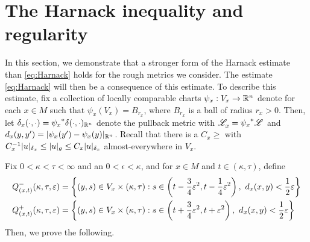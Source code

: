 \documentclass[a4paper, 12pt]{amsart}
\begin{document}
%

\section{The Harnack inequality and regularity}
\label{sec:harnack}


In this section, we demonstrate that a
 stronger form of the  Harnack 
estimate than \eqref{eq:Harnack} holds for the rough 
metrics we consider. The estimate \eqref{eq:Harnack} 
will then be a consequence of this estimate.
To describe this estimate, fix a collection of 
locally comparable charts $\psi_x:V_x \to \mathbb{R}^n$ denote
for each $x \in M$ such that $\psi_x(V_x) = B_{r_x}$,
where $B_{r_x}$ is a ball of radius $r_x > 0$. 
Then, let
$\delta_x(\cdot, \cdot) = {\psi_x}^\ast\delta(\cdot, \cdot)_{\mathbb{R}^n}$
denote the pullback metric with $\mathscr{L}^{{}}_x = {\psi_x}^\ast\mathscr{L}^{{}}$
and $d_x(y,y') = |\psi_x(y') - \psi_x(y)|_{\mathbb{R}^n}$.
Recall that there is a $C_x \geq $
with $C_x^{-1}  |u|_{\delta_x} \leq |u|_g \leq C_x |u|_{\delta_x}$
almost-everywhere in $V_x$.

Fix $0 < \kappa < \tau < \infty$ and an $0 < \epsilon < \kappa$,
and for $x \in M$ and $t \in (\kappa, \tau)$, define
\begin{equation}
\label{eq:paradef}
\begin{split} 
Q^-_{(x,t)}(\kappa, \tau, \epsilon) &= \set{(y,s) \in V_x \times (\kappa,\tau): s \in \cbrac{t - \frac{3}{4}\epsilon^2, t - \frac{1}{4} \epsilon^2},\ 
	d_x(x,y) < \frac{1}{2} \epsilon} \\
Q^+_{(x,t)}(\kappa, \tau, \epsilon) &= \set{(y,s) \in V_x \times (\kappa,\tau): s \in \cbrac{t + \frac{3}{4}\epsilon^2, t + \epsilon^2},\ 
	d_x(x,y) < \frac{1}{2} \epsilon}
\end{split}
\end{equation}
Then, we prove the following. 
\end{document}
